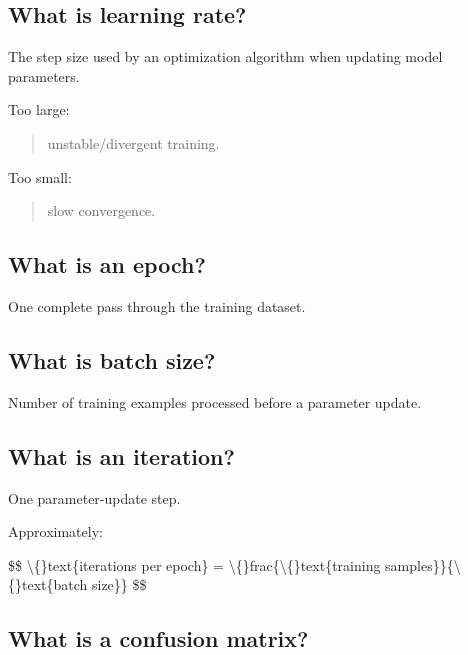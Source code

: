 \medskip

\subsection{What is learning rate?}

The step size used by an optimization algorithm when updating model parameters.

Too large:

\begin{quote}
unstable/divergent training.\\
\end{quote}

Too small:

\begin{quote}
slow convergence.\\
\end{quote}

\medskip

\subsection{What is an epoch?}

One complete pass through the training dataset.

\medskip

\subsection{What is batch size?}

Number of training examples processed before a parameter update.

\medskip

\subsection{What is an iteration?}

One parameter-update step.

Approximately:

\$\$
\textbackslash\{\}text\{iterations per epoch\}
=
\textbackslash\{\}frac\{\textbackslash\{\}text\{training samples\}\}\{\textbackslash\{\}text\{batch size\}\}
\$\$

\medskip

\subsection{What is a confusion matrix?}

